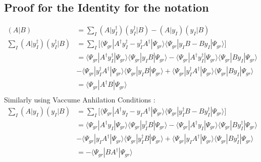 \documentclass[11pt, oneside]{article}   	%
\begin{document}
  \subsection{Proof for the Identity for the notation}
    \begin{equation*}\label{eq:resolution of identity}
      \begin{aligned}
        (A|B)&=\sum_I (A|y_I^\dagger)(y_I^\dagger|B)-(A|y_I)(y_I|B)\\
	\sum_I(A|y_I^\dagger)(y_I^\dagger|B)&=\sum_I \big[ \big \langle \Psi_{gr}|A^\dagger y_I^\dagger-y_I^\dagger A^\dagger|\Psi_{gr} \big \rangle 
	\big \langle \Psi_{gr}| y_I B- B y_I |\Psi_{gr} \big \rangle \big]\\
	&=\big \langle \Psi_{gr}| A^\dagger y_I^\dagger |\Psi_{gr} \big \rangle \big \langle \Psi_{gr}|y_I B|\Psi_{gr} \big \rangle 
	-\big \langle \Psi_{gr}| A^\dagger y_I^\dagger |\Psi_{gr} \big \rangle \big \langle \Psi_{gr}|B y_I |\Psi_{gr} \big \rangle\\ 
	&-\big \langle \Psi_{gr}| y_I^\dagger A^\dagger |\Psi_{gr} \big \rangle \big \langle \Psi_{gr}|y_I B|\Psi_{gr} \big \rangle 
	+\big \langle \Psi_{gr}|  y_I^\dagger A^\dagger|\Psi_{gr} \big \rangle \big \langle \Psi_{gr}|B y_I|\Psi_{gr} \big \rangle \\
	&=\big \langle \Psi_{gr}| A^\dagger B|\Psi_{gr} \big \rangle  \\
      \end{aligned}
    \end{equation*}
    Similarly using Vaccume Anhilation Conditions :
    \begin{equation*}
      \begin{aligned}
	\sum_I (A|y_I)(y_I|B)&=\sum_I \big[ \big \langle \Psi_{gr}|A^\dagger y_I-y_I A^\dagger|\Psi_{gr} \big \rangle 
	\big \langle \Psi_{gr}| y_I^\dagger B- B y_I^\dagger |\Psi_{gr} \big \rangle \big]\\
	&=\big \langle \Psi_{gr}| A^\dagger y_I |\Psi_{gr} \big \rangle \big \langle \Psi_{gr}|y_I^\dagger B|\Psi_{gr} \big \rangle 
	-\big \langle \Psi_{gr}| A^\dagger y_I |\Psi_{gr} \big \rangle \big \langle \Psi_{gr}|B y_I^\dagger |\Psi_{gr} \big \rangle\\ 
	&-\big \langle \Psi_{gr}| y_I A^\dagger |\Psi_{gr} \big \rangle \big \langle \Psi_{gr}|y_I^\dagger B|\Psi_{gr} \big \rangle 
	+\big \langle \Psi_{gr}|  y_I A^\dagger|\Psi_{gr} \big \rangle \big \langle \Psi_{gr}|B y_I^\dagger|\Psi_{gr} \big \rangle \\
	&=-\big \langle \Psi_{gr}|B A^\dagger |\Psi_{gr} \big \rangle \\
      \end{aligned}
    \end{equation*}
\end{document}
